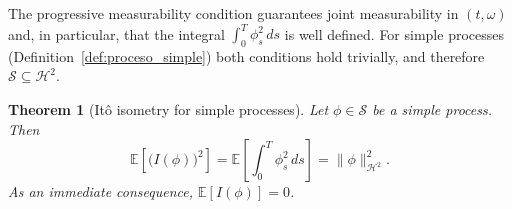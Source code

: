 \documentclass[11pt,a4paper,oneside]{report}
\theoremstyle{plain}
\newtheorem{teorema}{Theorem}[chapter]
\theoremstyle{definition}
\theoremstyle{remark}
\newcommand{\E}{\mathbb{E}}
\newcommand{\1}{\mathbf{1}}
\begin{document}
The progressive measurability condition guarantees joint
measurability in $(t, \omega)$ and, in particular, that the integral
$\int_0^T \phi_s^2\, ds$ is well defined. For simple processes
(Definition~\ref{def:proceso_simple}) both conditions hold trivially,
and therefore $\mathcal{S} \subseteq \mathcal{H}^2$.

\begin{teorema}[Itô isometry for simple processes]
\label{teo:isometria_ito_simples}
Let $\phi \in \mathcal{S}$ be a simple process. Then
\begin{equation}\label{eq:isometria_ito_simples}
  \E\!\left[\bigl(I(\phi)\bigr)^2\right]
  = \E\!\left[\int_0^T \phi_s^2\, ds\right]
  = \|\phi\|_{\mathcal{H}^2}^2.
\end{equation}
As an immediate consequence, $\E[I(\phi)] = 0$.
\end{teorema}
\end{document}
